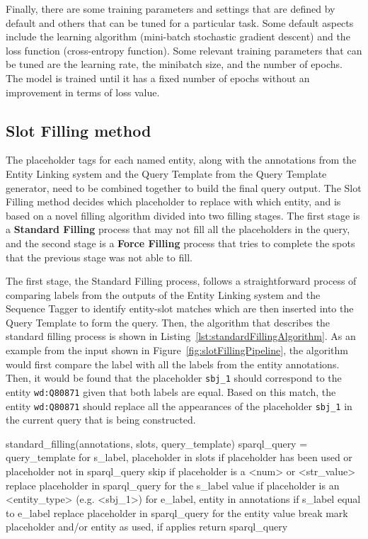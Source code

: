 Finally, there are some training parameters and settings that are defined by default and 
others that can be tuned for a particular task. Some default aspects include the learning 
algorithm (mini-batch stochastic gradient descent) and the loss function (cross-entropy 
function). Some relevant training parameters that can be tuned are the learning rate, the 
minibatch size, and the number of epochs. The model is trained until it has a fixed number of 
epochs without an improvement in terms of loss value.

\subsection{Slot Filling method}
\label{cap3:system/slotFillModule/fillingMethod}
The placeholder tags for each named entity, along with the annotations from the Entity 
Linking system and the Query Template from the Query Template generator, need to be combined 
together to build the final \SPARQL{} query output. The Slot Filling method decides which 
placeholder to replace with which entity, and is based on a novel filling algorithm divided 
into two filling stages. The first stage is a \textbf{Standard Filling} process that may not 
fill all the placeholders in the query, and the second stage is a \textbf{Force Filling} 
process that tries to complete the spots that the previous stage was not able to fill.

The first stage, the Standard Filling process, follows a straightforward process of comparing 
labels from the outputs of the Entity Linking system and the Sequence Tagger to identify 
entity-slot matches which are then inserted into the Query Template to form the \SPARQL{} query. 
Then, the algorithm that describes the standard filling process is shown in 
Listing~\ref{lst:standardFillingAlgorithm}. As an example from the input shown in 
Figure~\ref{fig:slotFillingPipeline}, the algorithm would first compare the label 
 with all the labels from the entity annotations. Then, it would 
be found that the placeholder \texttt{sbj\_1} should correspond to the entity 
\texttt{wd:Q80871} given that both labels are equal. Based on this match, the entity 
\texttt{wd:Q80871} should replace all the appearances of the placeholder \texttt{sbj\_1} in 
the current \SPARQL{} query that is being constructed.

\begin{sparqlcode}[%
    caption={Standard Filling algorithm.}, 
    label={lst:standardFillingAlgorithm}]
standard_filling(annotations, slots, query_template)
    sparql_query = query_template
    for s_label, placeholder in slots
        if placeholder has been used or placeholder not in sparql_query
            skip
        if placeholder is a <num> or <str_value>
            replace placeholder in sparql_query for the s_label value
        if placeholder is an <entity_type> (e.g. <sbj_1>)
            for e_label, entity in annotations
                if s_label equal to e_label
                    replace placeholder in sparql_query for the entity value
                    break
        mark placeholder and/or entity as used, if applies
    return sparql_query
\end{sparqlcode}

